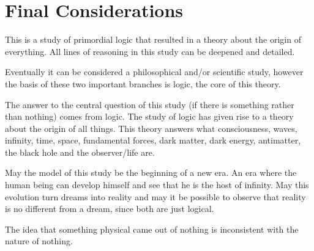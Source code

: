 \section*{Final Considerations}
This is a study of primordial logic that resulted in a theory about the origin of everything. All lines of reasoning in this study can be deepened and detailed.

Eventually it can be considered a philosophical and/or scientific study, however the basis of these two important branches is logic, the core of this theory. 

The answer to the central question of this study (if there is something rather than nothing) comes from logic. The study of logic has given rise to a theory about the origin of all things. This theory answers what consciousness, waves, infinity, time, space, fundamental forces, dark matter, dark energy, antimatter, the black hole and the observer/life are.

May the model of this study be the beginning of a new era. An era where the human being can develop himself and see that he is the host of infinity. May this evolution turn dreams into reality and may it be possible to observe that reality is no different from a dream, since both are just logical.

The idea that something physical came out of nothing is inconsistent with the nature of nothing.